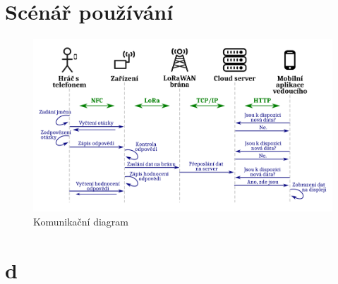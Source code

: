 \section{Scénář používání}

\begin{figure}[h]
    \begin{centering}
        \includegraphics[width=1\textwidth]{Figures/communication-diagram.png}
        \caption{Komunikační diagram}
        \label{fig:Usage_comm_diag}
    \end{centering}
\end{figure}

\section{d}